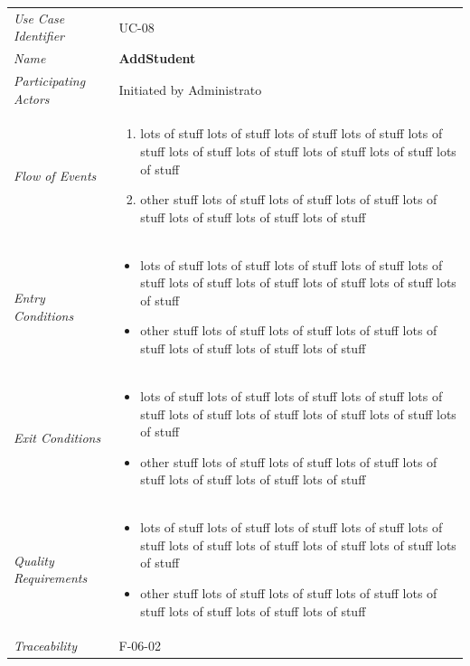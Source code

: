 \documentclass[12pt,letterpaper]{article}
\begin{document}
\begin{center}
	\begin{tabu} to 
		\toprule
		Use Case Identifier & UC-08 \\
		Name & {\bf AddStudent} \\
		Participating Actors & Initiated by Administrato \\
		Flow of Events & 
	    \begin{enumerate}[topsep=-1em]
		    \item lots of stuff lots of stuff lots of stuff lots of stuff lots of stuff lots of stuff lots of stuff lots of stuff lots of stuff lots of stuff
		    \item other stuff lots of stuff lots of stuff lots of stuff lots of stuff lots of stuff lots of stuff lots of stuff
		\end{enumerate} \\

		Entry Conditions &
		\begin{itemize}[topsep=-1em]
		    \item lots of stuff lots of stuff lots of stuff lots of stuff lots of stuff lots of stuff lots of stuff lots of stuff lots of stuff lots of stuff
		    \item other stuff lots of stuff lots of stuff lots of stuff lots of stuff lots of stuff lots of stuff lots of stuff
        \end{itemize} \\

		Exit Conditions &
		\begin{itemize}[topsep=-1em]
		    \item lots of stuff lots of stuff lots of stuff lots of stuff lots of stuff lots of stuff lots of stuff lots of stuff lots of stuff lots of stuff
		    \item other stuff lots of stuff lots of stuff lots of stuff lots of stuff lots of stuff lots of stuff lots of stuff
        \end{itemize} \\

		Quality Requirements &
		\begin{itemize}[topsep=-1em]
		    \item lots of stuff lots of stuff lots of stuff lots of stuff lots of stuff lots of stuff lots of stuff lots of stuff lots of stuff lots of stuff
		    \item other stuff lots of stuff lots of stuff lots of stuff lots of stuff lots of stuff lots of stuff lots of stuff
        \end{itemize} \\

		Traceability & F-06-02 \\
		\toprule
	\end{tabu}
\end{center}
\end{document}
